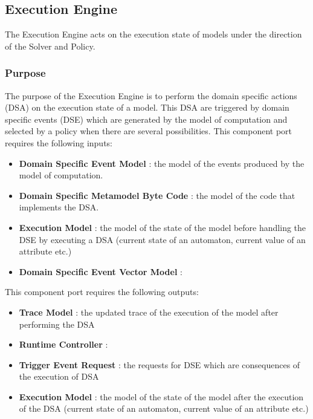 \documentclass{gemoc} %
\begin{document}
\subsection{Execution Engine}
The Execution Engine acts on the execution state of models under the direction of the Solver and Policy.

\subsubsection{Purpose}
The purpose of the Execution Engine is to perform the domain specific actions (DSA) on the execution state of a model. This DSA are triggered by domain specific events (DSE) which are generated by the model of computation and selected by a policy when there are several possibilities.
This component port requires the following inputs:
\begin{itemize}
  \item \textbf{Domain Specific Event Model} :
  the model of the events produced by the model of computation.
  \item \textbf{Domain Specific Metamodel Byte Code} :
  the model of the code that implements the DSA.
  \item \textbf{Execution Model} :
    the model of the state of the model before handling the DSE by executing a DSA (current state of an automaton, current value of an attribute etc.)
  \item \textbf{Domain Specific Event Vector Model} :
\end{itemize}

This component port requires the following outputs:
\begin{itemize}
  \item \textbf{Trace Model} :
    the updated trace of the execution of the model after performing the DSA
  \item \textbf{Runtime Controller} :
  \item \textbf{Trigger Event Request} :
    the requests for DSE which are consequences of the execution of DSA
  \item \textbf{Execution Model} :
    the model of the state of the model after the execution of the DSA (current state of an automaton, current value of an attribute etc.)
\end{itemize}
\end{document}
